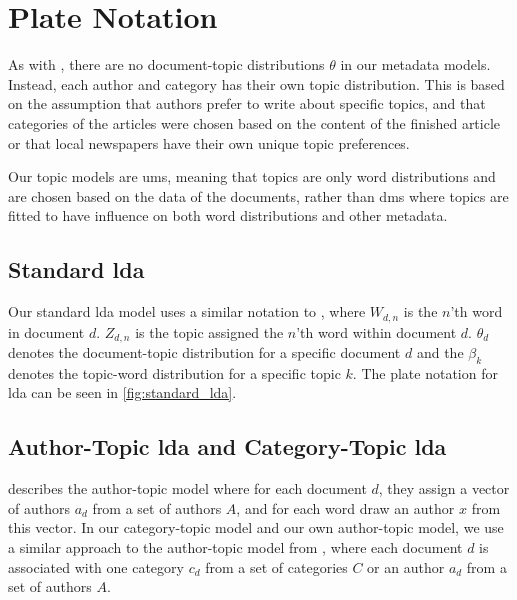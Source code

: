 \section{Plate Notation}\label{sec:plate_notation}
As with \citet{author_topic_2012}, there are no document-topic distributions $\theta$ in our metadata models.
Instead, each author and category has their own topic distribution.
This is based on the assumption that authors prefer to write about specific topics, and that categories of the articles were chosen based on the content of the finished article or that local newspapers have their own unique topic preferences.

Our topic models are \glspl{um}, meaning that topics are only word distributions and are chosen based on the data of the documents, rather than \glspl{dm} where topics are fitted to have influence on both word distributions and other metadata.

\subsection{Standard \gls{lda}}
Our standard \gls{lda} model uses a similar notation to \citet{blei2003latent}, where $W_{d,n}$ is the $n$'th word in document $d$.
$Z_{d,n}$ is the topic assigned the $n$'th word within document $d$.
$\theta_d$ denotes the document-topic distribution for a specific document $d$ and the $\beta_k$ denotes the topic-word distribution for a specific topic $k$.
The plate notation for \gls{lda} can be seen in \autoref{fig:standard_lda}.



\subsection{Author-Topic \gls{lda} and Category-Topic \gls{lda}}
\citet{author_topic_2012} describes the author-topic model where for each document $d$, they assign a vector of authors $a_d$ from a set of authors $A$, and for each word draw an author $x$ from this vector.
In our category-topic model and our own author-topic model, we use a similar approach to the author-topic model from \citeauthor{author_topic_2012}, where each document $d$ is associated with one category $c_d$ from a set of categories $C$ or an author $a_d$ from a set of authors $A$.


